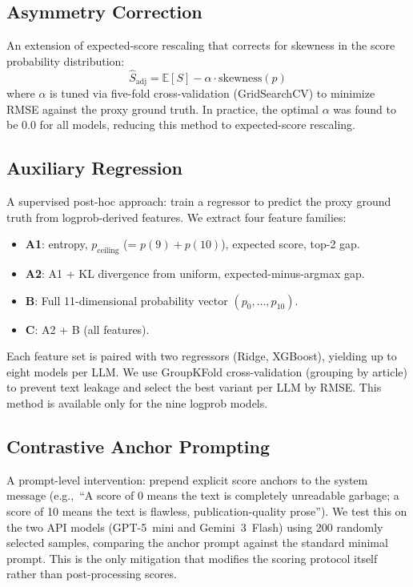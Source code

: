 \documentclass[11pt]{article}
\newcommand{\eg}{e.g.,\ }
\begin{document}
\subsection{Asymmetry Correction}

An extension of expected-score rescaling that corrects for skewness in the score probability distribution:
\begin{equation}
    \hat{S}_{\text{adj}} = \mathbb{E}[S] - \alpha \cdot \text{skewness}(p)
\end{equation}
where $\alpha$ is tuned via five-fold cross-validation (GridSearchCV) to minimize RMSE against the proxy ground truth. In practice, the optimal $\alpha$ was found to be 0.0 for all models, reducing this method to expected-score rescaling.

\subsection{Auxiliary Regression}

A supervised post-hoc approach: train a regressor to predict the proxy ground truth from logprob-derived features. We extract four feature families:
\begin{itemize}[nosep]
    \item \textbf{A1}: entropy, $p_{\text{ceiling}}$ (= $p(9) + p(10)$), expected score, top-2 gap.
    \item \textbf{A2}: A1 + KL divergence from uniform, expected-minus-argmax gap.
    \item \textbf{B}: Full 11-dimensional probability vector $(p_0, \ldots, p_{10})$.
    \item \textbf{C}: A2 + B (all features).
\end{itemize}
Each feature set is paired with two regressors (Ridge, XGBoost), yielding up to eight models per LLM. We use GroupKFold cross-validation (grouping by article) to prevent text leakage and select the best variant per LLM by RMSE. This method is available only for the nine logprob models.

\subsection{Contrastive Anchor Prompting}

A prompt-level intervention: prepend explicit score anchors to the system message (\eg ``A score of 0 means the text is completely unreadable garbage; a score of 10 means the text is flawless, publication-quality prose''). We test this on the two API models (GPT-5~mini and Gemini~3~Flash) using 200 randomly selected samples, comparing the anchor prompt against the standard minimal prompt. This is the only mitigation that modifies the scoring protocol itself rather than post-processing scores.
\end{document}
